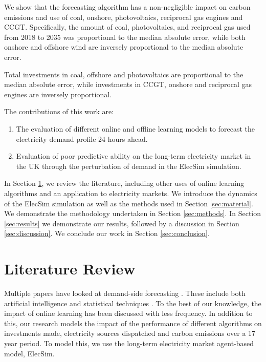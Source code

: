We show that the forecasting algorithm has a non-negligible impact on carbon emissions and use of coal, onshore, photovoltaics, reciprocal gas engines and CCGT. Specifically, the amount of coal, photovoltaics, and reciprocal gas used from 2018 to 2035 was proportional to the median absolute error, while both onshore and offshore wind are inversely proportional to the median absolute error.

Total investments in coal, offshore and photovoltaics are proportional to the median absolute error, while investments in CCGT, onshore and reciprocal gas engines are inversely proportional.




The contributions of this work are:

\begin{enumerate}
  \item The evaluation of different online and offline learning models to forecast the electricity demand profile 24 hours ahead.
  \item Evaluation of poor predictive ability on the long-term electricity market in the UK through the perturbation of demand in the ElecSim simulation.
\end{enumerate}


 


In Section \ref{sec:lit-review}, we review the literature, including other uses of online learning algorithms and an application to electricity markets. We introduce the dynamics of the ElecSim simulation as well as the methods used in Section \ref{sec:material}. We demonstrate the methodology undertaken in Section \ref{sec:methods}. In Section \ref{sec:results} we demonstrate our results, followed by a discussion in Section \ref{sec:discussion}. We conclude our work in Section \ref{sec:conclusion}.

\section{Literature Review}
\label{sec:lit-review}

Multiple papers have looked at demand-side forecasting \cite{Singh2012}. These include both artificial intelligence \cite{Kim2000, Tiong2008,Quilumba2014} and statistical techniques \cite{Huang2003,Nguyen2017}. To the best of our knowledge, the impact of online learning has been discussed with less frequency. In addition to this, our research models the impact of the performance of different algorithms on investments made, electricity sources dispatched and carbon emissions over a 17 year period. To model this, we use the long-term electricity market agent-based model, ElecSim.

